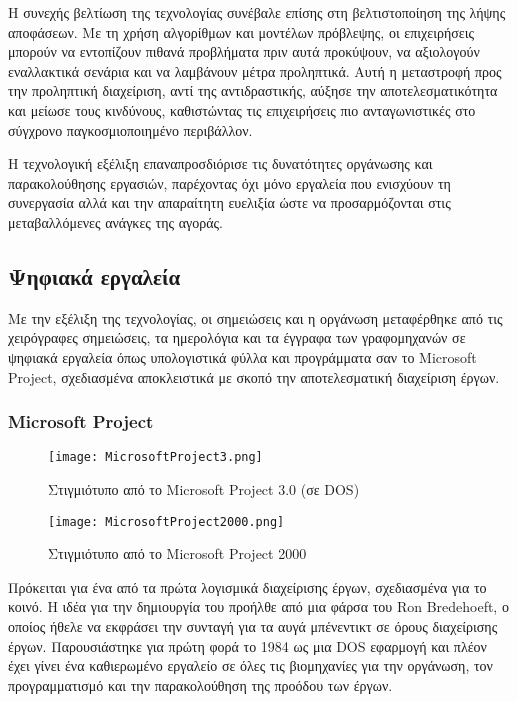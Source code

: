         Η συνεχής βελτίωση της τεχνολογίας συνέβαλε επίσης στη βελτιστοποίηση της λήψης αποφάσεων. Με τη χρήση αλγορίθμων και μοντέλων πρόβλεψης, οι επιχειρήσεις μπορούν να εντοπίζουν πιθανά προβλήματα πριν αυτά προκύψουν, να αξιολογούν εναλλακτικά σενάρια και να λαμβάνουν μέτρα προληπτικά. Αυτή η μεταστροφή προς την προληπτική διαχείριση, αντί της αντιδραστικής, αύξησε την αποτελεσματικότητα και μείωσε τους κινδύνους, καθιστώντας τις επιχειρήσεις πιο ανταγωνιστικές στο σύγχρονο παγκοσμιοποιημένο περιβάλλον.

        Η τεχνολογική εξέλιξη επαναπροσδιόρισε τις δυνατότητες οργάνωσης και παρακολούθησης εργασιών, παρέχοντας όχι μόνο εργαλεία που ενισχύουν τη συνεργασία αλλά και την απαραίτητη ευελιξία ώστε να προσαρμόζονται στις μεταβαλλόμενες ανάγκες της αγοράς.


        \subsection{Ψηφιακά εργαλεία}
            Με την εξέλιξη της τεχνολογίας, οι σημειώσεις και η οργάνωση μεταφέρθηκε από τις χειρόγραφες σημειώσεις, τα ημερολόγια και τα έγγραφα των γραφομηχανών σε ψηφιακά εργαλεία όπως υπολογιστικά φύλλα και προγράμματα σαν το Microsoft Project, σχεδιασμένα αποκλειστικά με σκοπό την αποτελεσματική διαχείριση έργων.

            \subsubsection{Microsoft Project}
                \begin{figure}[H] \noindent \centering
                    \texttt{[image: MicrosoftProject3.png]}
                    \caption{\centering Στιγμιότυπο από το Microsoft Project 3.0 (σε DOS) \cite{WinWorld}}
                \end{figure}

                \begin{figure}[H] \noindent \centering
                    \texttt{[image: MicrosoftProject2000.png]}
                    \caption{\centering Στιγμιότυπο από το Microsoft Project 2000 \cite{WinWorld}}
                \end{figure}

                Πρόκειται για ένα από τα πρώτα λογισμικά διαχείρισης έργων, σχεδιασμένα για το κοινό. Η ιδέα για την δημιουργία του προήλθε από μια φάρσα του Ron Bredehoeft, ο οποίος ήθελε να εκφράσει την συνταγή για τα αυγά μπένεντικτ σε όρους διαχείρισης έργων. Παρουσιάστηκε για πρώτη φορά το 1984 ως μια DOS εφαρμογή και πλέον έχει γίνει ένα καθιερωμένο εργαλείο σε όλες τις βιομηχανίες για την οργάνωση, τον προγραμματισμό και την παρακολούθηση της προόδου των έργων.

